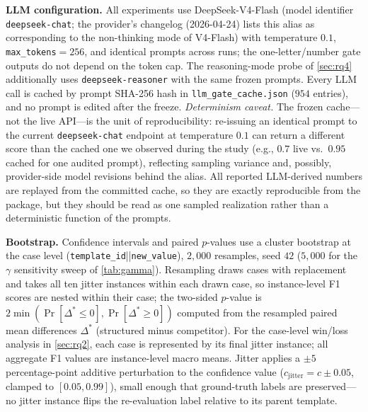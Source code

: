 \documentclass{article}
\theoremstyle{definition}
\begin{document}
\textbf{LLM configuration.}  All experiments use DeepSeek-V4-Flash
(model identifier \texttt{deepseek-chat}; the provider's changelog
(2026-04-24) lists this alias as corresponding to the non-thinking mode
of V4-Flash) with temperature $0.1$,
\texttt{max\_tokens}$=256$, and identical prompts across runs; the
one-letter/number gate outputs do not depend on the token cap.  The
reasoning-mode probe of \cref{sec:rq4} additionally uses
\texttt{deepseek-reasoner} with the same frozen prompts.  Every LLM
call is cached by prompt SHA-256 hash in
\texttt{llm\_gate\_cache.json} ($954$ entries), and no prompt is edited
after the freeze.  \emph{Determinism caveat.}  The frozen cache---not the
live API---is the unit of reproducibility: re-issuing an identical
prompt to the current \texttt{deepseek-chat} endpoint at temperature
$0.1$ can return a different score than the cached one we observed
during the study (e.g., $0.7$ live vs.\ $0.95$ cached for one audited
prompt), reflecting sampling variance and, possibly, provider-side model
revisions behind the alias.  All reported LLM-derived numbers are
replayed from the committed cache, so they are exactly reproducible from
the package, but they should be read as one sampled realization rather
than a deterministic function of the prompts.

\textbf{Bootstrap.}  Confidence intervals and paired $p$-values use a
cluster bootstrap at the case level
(\texttt{template\_id}||\texttt{new\_value}), $2{,}000$ resamples, seed
$42$ ($5{,}000$ for the $\gamma$ sensitivity sweep of
\cref{tab:gamma}).  Resampling draws cases with replacement and takes all ten jitter
instances within each drawn case, so instance-level F1 scores are nested
within their case; the two-sided $p$-value is
$2\min(\Pr[\Delta^*\le 0],\Pr[\Delta^*\ge 0])$ computed from the resampled
paired mean differences $\Delta^*$ (structured minus competitor).  For the
case-level win/loss analysis in \cref{sec:rq2}, each case is represented by
its final jitter instance; all aggregate F1 values are instance-level macro
means.  Jitter applies a $\pm 5$ percentage-point additive
perturbation to the confidence value
($c_{\text{jitter}} = c \pm 0.05$, clamped to $[0.05,0.99]$), small enough
that ground-truth labels are preserved---no jitter instance flips the
re-evaluation label relative to its parent template.
\end{document}
